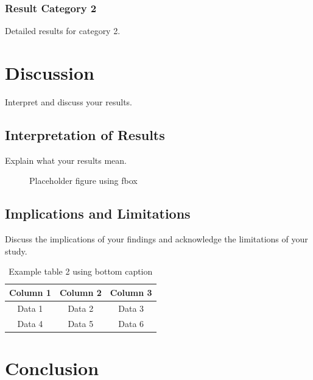 \subsection{Result Category 2}

Detailed results for category 2.

\chapter{Discussion}

Interpret and discuss your results.

\section{Interpretation of Results}

Explain what your results mean. 
\begin{figure}[ht]
    \centering  %
    \caption{Placeholder figure using fbox}
    \label{fig:example2}
\end{figure}

\section{Implications and Limitations}

Discuss the implications of your findings and acknowledge the limitations of your study. 
\begin{table}[ht]
    \centering
    \begin{tabular}{|c|c|c|}
        \hline
        Column 1 & Column 2 & Column 3 \\
        \hline
        Data 1 & Data 2 & Data 3 \\
        Data 4 & Data 5 & Data 6 \\
        \hline
    \end{tabular}
    \label{tab:example2}
    \caption{Example table 2 using bottom caption}
\end{table}

\chapter{Conclusion}

